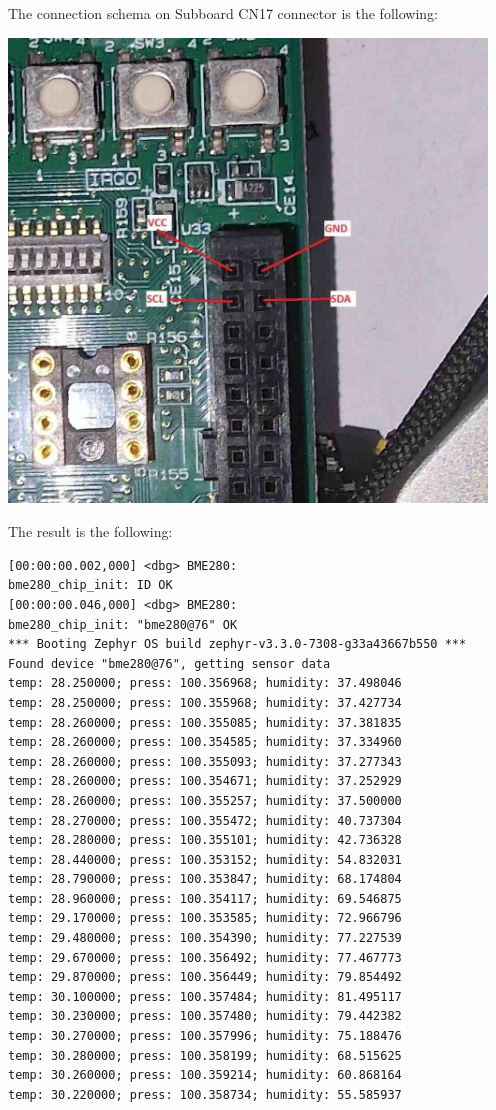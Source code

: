 \documentclass[11pt,a4paper,oneside]{article}
\begin{document}
The connection schema on Subboard CN17 connector is the following:

\includegraphics[width=5in,height=4.85417in]{./media/uart_conn.jpg}

The result is the following:

\begin{lstlisting}
[00:00:00.002,000] <dbg> BME280:
bme280_chip_init: ID OK
[00:00:00.046,000] <dbg> BME280:
bme280_chip_init: "bme280@76" OK
*** Booting Zephyr OS build zephyr-v3.3.0-7308-g33a43667b550 ***
Found device "bme280@76", getting sensor data
temp: 28.250000; press: 100.356968; humidity: 37.498046
temp: 28.250000; press: 100.355968; humidity: 37.427734
temp: 28.260000; press: 100.355085; humidity: 37.381835
temp: 28.260000; press: 100.354585; humidity: 37.334960
temp: 28.260000; press: 100.355093; humidity: 37.277343
temp: 28.260000; press: 100.354671; humidity: 37.252929
temp: 28.260000; press: 100.355257; humidity: 37.500000
temp: 28.270000; press: 100.355472; humidity: 40.737304
temp: 28.280000; press: 100.355101; humidity: 42.736328
temp: 28.440000; press: 100.353152; humidity: 54.832031
temp: 28.790000; press: 100.353847; humidity: 68.174804
temp: 28.960000; press: 100.354117; humidity: 69.546875
temp: 29.170000; press: 100.353585; humidity: 72.966796
temp: 29.480000; press: 100.354390; humidity: 77.227539
temp: 29.670000; press: 100.356492; humidity: 77.467773
temp: 29.870000; press: 100.356449; humidity: 79.854492
temp: 30.100000; press: 100.357484; humidity: 81.495117
temp: 30.230000; press: 100.357480; humidity: 79.442382
temp: 30.270000; press: 100.357996; humidity: 75.188476
temp: 30.280000; press: 100.358199; humidity: 68.515625
temp: 30.260000; press: 100.359214; humidity: 60.868164
temp: 30.220000; press: 100.358734; humidity: 55.585937
\end{lstlisting}
\end{document}
